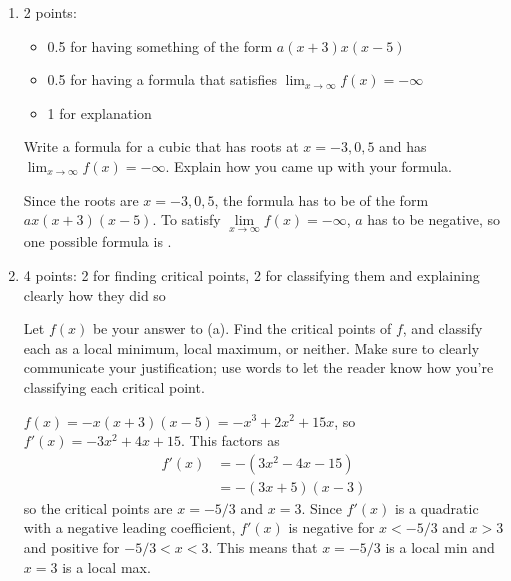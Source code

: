 \documentclass{article}
\begin{document}
\begin{enumerate}

  \begin{enumerate}
  \item

    \begin{grading}
      2 points:
      \begin{itemize}[nosep]
      \item 0.5 for having something of the form $a (x + 3)x (x - 5)$
      \item 0.5 for having a formula that satisfies $\displaystyle \lim_{x \to \infty} f(x) = -\infty$
      \item 1 for explanation
      \end{itemize}
    \end{grading}

    \begin{problem}[\stretch{0.35}]
      Write a formula for a cubic that has roots at $x = -3, 0, 5$ and has $\displaystyle \lim_{x \to \infty} f(x) = - \infty$. Explain how you came up with your formula. 
    \end{problem}

    \begin{solution}
      Since the roots are $x=-3, 0, 5$, the formula has to be of the
      form $ax(x+3)(x-5)$. To satisfy 
      $\lim\limits_{x \to \infty} f(x) = - \infty$, $a$ has to be negative,
      so one possible formula is .
    \end{solution}

  \item

    \begin{grading}
      4 points: 2 for finding critical points, 2 for classifying them and explaining clearly how they did so
    \end{grading}

    \begin{problem}[\vfill]
      Let $f(x)$ be your answer to (a). Find the critical points of $f$, and classify each as a local minimum, local maximum, or neither. Make sure to clearly communicate your justification; use words to let the reader know how you're classifying each critical point.
    \end{problem}

    \begin{solution}
      $f(x)=-x(x+3)(x-5)=-x^3+2x^2+15x$, so $f'(x)=-3x^2+4x+15$. This factors as
      \begin{align*}
        f'(x) &= -(3x^2-4x-15) \\
        &= -(3x+5)(x-3)
      \end{align*}
      so the critical points are $x=-5/3$ and $x=3$. Since $f'(x)$ is
      a quadratic with a negative leading coefficient, $f'(x)$ is negative
      for $x<-5/3$ and $x>3$ and positive for $-5/3<x<3$. This means
      that $x=-5/3$ is a local min and $x=3$ is a local max.
    \end{solution}


\end{enumerate}
\end{enumerate}
\end{document}
